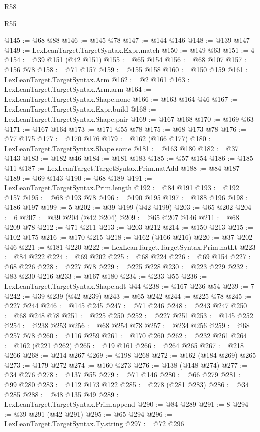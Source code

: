 \begin{lexlean}{R58}
\begin{lexlean}{R55}
\begin{coremodule}
{{{{{{{{{{{{{{{{{{{{{{{{{{{{{{{{{{{{{{{{{{{{{{{{{{{{{{{{{{{{@145 := @68 @88
@146 := @145 @78
@147 := @144 @146
@148 := @139 @147
@149 := LexLeanTarget.TargetSyntax.Expr.match
@150 := @149 @63
@151 := 4
@154 := @39 @151 (@42 @151)
@155 := @65 @154
@156 := @68 @107
@157 := @156 @78
@158 := @71 @157
@159 := @155 @158
@160 := @150 @159
@161 := LexLeanTarget.TargetSyntax.Arm
@162 := @2 @161
@163 := LexLeanTarget.TargetSyntax.Arm.arm
@164 := LexLeanTarget.TargetSyntax.Shape.none
@166 := @163 @164 @46
@167 := LexLeanTarget.TargetSyntax.Expr.build
@168 := LexLeanTarget.TargetSyntax.Shape.pair
@169 := @167 @168
@170 := @169 @63
@171 := @167 @164
@173 := @171 @55 @78
@175 := @68 @173 @78
@176 := @77 @175
@177 := @170 @176
@179 := @162 (@166 @177)
@180 := LexLeanTarget.TargetSyntax.Shape.some
@181 := @163 @180
@182 := @37 @143
@183 := @182 @46
@184 := @181 @183
@185 := @57 @154
@186 := @185 @11
@187 := LexLeanTarget.TargetSyntax.Prim.natAdd
@188 := @84 @187
@189 := @69 @143
@190 := @68 @189
@191 := LexLeanTarget.TargetSyntax.Prim.length
@192 := @84 @191
@193 := @192 @157
@195 := @68 @193 @78
@196 := @190 @195
@197 := @188 @196
@198 := @186 @197
@199 := 5
@202 := @39 @199 (@42 @199)
@203 := @65 @202
@204 := 6
@207 := @39 @204 (@42 @204)
@209 := @65 @207 @146
@211 := @68 @209 @78
@212 := @71 @211
@213 := @203 @212
@214 := @150 @213
@215 := @102 @175
@216 := @170 @215
@218 := @162 (@166 @216)
@220 := @37 @202 @46
@221 := @181 @220
@222 := LexLeanTarget.TargetSyntax.Prim.natLt
@223 := @84 @222
@224 := @69 @202
@225 := @68 @224
@226 := @69 @154
@227 := @68 @226
@228 := @227 @78
@229 := @225 @228
@230 := @223 @229
@232 := @83 @230 @216
@233 := @167 @180
@234 := @233 @55
@236 := LexLeanTarget.TargetSyntax.Shape.adt @44
@238 := @167 @236 @54
@239 := 7
@242 := @39 @239 (@42 @239)
@243 := @65 @242
@244 := @225 @78
@245 := @227 @244
@246 := @145 @245
@247 := @71 @246
@248 := @243 @247
@250 := @68 @248 @78
@251 := @225 @250
@252 := @227 @251
@253 := @145 @252
@254 := @238 @253
@256 := @68 @254 @78
@257 := @234 @256
@259 := @68 @257 @78
@260 := @116 @259
@261 := @170 @260
@262 := @232 @261
@264 := @162 (@221 @262)
@265 := @19 @161
@266 := @264 @265
@267 := @218 @266
@268 := @214 @267
@269 := @198 @268
@272 := @162 (@184 @269) @265
@273 := @179 @272
@274 := @160 @273
@276 := @138 (@148 @274)
@277 := @34 @276
@278 := @137 @55
@279 := @71 @146
@280 := @66 @279
@281 := @99 @280
@283 := @112 @173 @122
@285 := @278 (@281 @283)
@286 := @34 @285
@288 := @48 @135 @49
@289 := LexLeanTarget.TargetSyntax.Prim.append
@290 := @84 @289
@291 := 8
@294 := @39 @291 (@42 @291)
@295 := @65 @294
@296 := LexLeanTarget.TargetSyntax.Ty.string
@297 := @72 @296
}}}}}}}}}}}}}}}}}}}}}}}}}}}}}}}}}}}}}}}}}}}}}}}}}}}}}}}}}}}}
\end{coremodule}
\end{lexlean}
\end{lexlean}
